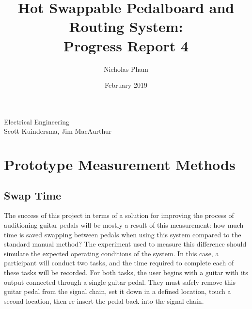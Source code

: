 \documentclass{article}
\title{Hot Swappable Pedalboard and Routing System:\\Progress Report 4}
\author{Nicholas Pham}
\date{February 2019}
\begin{document}
\maketitle
\begin{center}
    Electrical Engineering \\
    Scott Kuindersma, Jim MacAurthur
\end{center}



% 
% 


\section{Prototype Measurement Methods}
	\subsection{Swap Time}
	The success of this project in terms of a solution for improving the process of auditioning guitar pedals will be mostly a result of this measurement: how much time is saved swapping between pedals when using this system compared to the standard manual method?  The experiment used to measure this difference should simulate the expected operating conditions of the system.  In this case, a participant will conduct two tasks, and the time required to complete each of these tasks will be recorded.  For both tasks, the user begins with a guitar with its output connected through a single guitar pedal.  They must safely remove this guitar pedal from the signal chain, set it down in a defined location, touch a second location, then re-insert the pedal back into the signal chain.
\end{document}
